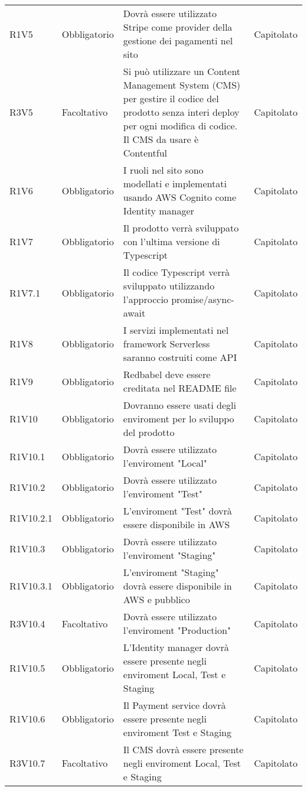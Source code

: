 {\begin{longtable}{C{2.5cm} C{2.8cm} C{6.7cm} C{2.5cm}}
R1V5 & Obbligatorio & Dovrà essere utilizzato Stripe come provider della gestione dei pagamenti nel sito & Capitolato \\

R3V5 & Facoltativo & Si può utilizzare un Content Management System (CMS) per gestire il codice del prodotto senza interi deploy per ogni modifica di codice. Il CMS da usare è Contentful & Capitolato \\

R1V6 & Obbligatorio & I ruoli nel sito sono modellati e implementati usando AWS Cognito come Identity manager & Capitolato \\

R1V7 & Obbligatorio & Il prodotto verrà sviluppato con l'ultima versione di Typescript & Capitolato \\
R1V7.1 & Obbligatorio & Il codice Typescript verrà sviluppato utilizzando l'approccio promise/async-await & Capitolato \\

R1V8 & Obbligatorio & I servizi implementati nel framework Serverless saranno costruiti come API & Capitolato \\

R1V9 & Obbligatorio & Redbabel deve essere creditata nel README file  & Capitolato \\

R1V10 & Obbligatorio & Dovranno essere usati degli enviroment per lo sviluppo del prodotto & Capitolato \\
R1V10.1 & Obbligatorio & Dovrà essere utilizzato l'enviroment "Local" & Capitolato \\
R1V10.2 & Obbligatorio & Dovrà essere utilizzato l'enviroment "Test" & Capitolato \\
R1V10.2.1 & Obbligatorio & L'enviroment "Test" dovrà essere disponibile in AWS & Capitolato \\
R1V10.3 & Obbligatorio & Dovrà essere utilizzato l'enviroment "Staging" & Capitolato \\
R1V10.3.1 & Obbligatorio & L'enviroment "Staging" dovrà essere disponibile in AWS e pubblico & Capitolato \\
R3V10.4 & Facoltativo & Dovrà essere utilizzato l'enviroment "Production" & Capitolato \\

R1V10.5 & Obbligatorio & L'Identity manager dovrà essere presente negli enviroment Local, Test e Staging & Capitolato \\
R1V10.6 & Obbligatorio & Il Payment service dovrà essere presente negli enviroment Test e Staging & Capitolato \\
R3V10.7 & Facoltativo & Il CMS dovrà essere presente negli enviroment Local, Test e Staging & Capitolato \\

\end{longtable}

}